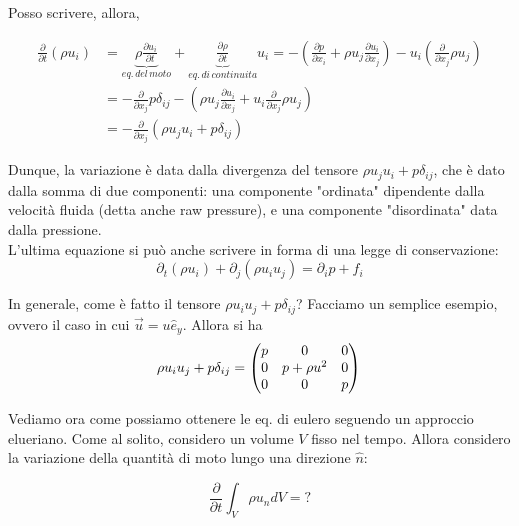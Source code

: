 \documentclass{report}
\begin{document}
Posso scrivere, allora, 

\begin{align}
    \frac{\partial }{\partial t}(\rho u_i) &= \underbrace{\rho \frac{\partial u_i}{\partial t}}_{eq. \, del \, moto} + \underbrace{\frac{\partial \rho}{\partial t}}_{eq. \, di \, continuita}u_i = -\left(\frac{\partial p}{\partial x_i} + \rho u_j \frac{\partial u_i}{\partial x_j} \right) - u_i\left(\frac{\partial}{\partial x_j}\rho u_j \right) \\
    &= -\frac{\partial }{\partial x_j}p\delta_{ij} - \left(\rho u_j \frac{\partial u_i}{\partial x_j} + u_i\frac{\partial}{\partial x_j}\rho u_j\right) \\ 
    &= -\frac{\partial}{\partial x_j}\left(\rho u_ju_i + p\delta_{ij} \right)
\end{align}

Dunque, la variazione è data dalla divergenza del tensore $\rho u_ju_i + p\delta_{ij}$, che è dato dalla somma di due componenti: una componente "ordinata" dipendente dalla velocità fluida (detta anche raw pressure), e una componente "disordinata" data dalla pressione. \\

L'ultima equazione si può anche scrivere in forma di una legge di conservazione: 
\begin{equation}
    \partial_t(\rho u_i) + \partial_j(\rho u_iu_j) = \partial_i p + f_i
\end{equation}

In generale, come è fatto il tensore $\rho u_iu_j + p\delta_{ij}$? Facciamo un semplice esempio, ovvero il caso in cui $\vec{u} = u\hat{e}_y$. Allora si ha 
\begin{equation}
    \rho u_iu_j + p\delta_{ij} = \begin{pmatrix}
        p & 0& 0 \\
        0 & p+\rho u^2 & 0 \\
        0 & 0 & p
    \end{pmatrix}
    \\
\end{equation}

Vediamo ora come possiamo ottenere le eq. di eulero seguendo un approccio elueriano. Come al solito, considero un volume $V$ fisso nel tempo. Allora considero la variazione della quantità di moto lungo una direzione $\hat{n}$: 

\begin{equation}
    \frac{\partial}{\partial t}\int_V \rho u_n dV = ?
\end{equation}
\end{document}
